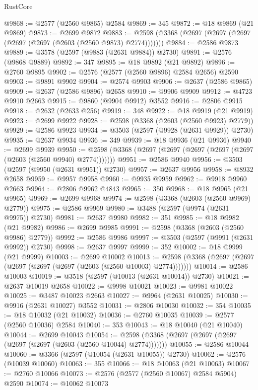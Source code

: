 \begin{lexlean}{RustCore}
\begin{coremodule}
@9868 := @2577 (@2560 @9865) @2584
@9869 := 345
@9872 := @18 @9869 (@21 @9869)
@9873 := @2699 @9872
@9883 := @2598 (@3368 (@2697 (@2697 (@2697 (@2697 (@2697 (@2603 (@2560 @9873) @2774)))))))
@9884 := @2586 @9873
@9889 := @3578 (@2597 (@9883 (@2631 @9884)) @2730)
@9891 := @2576 (@9868 @9889)
@9892 := 347
@9895 := @18 @9892 (@21 @9892)
@9896 := @2760 @9895
@9902 := @2576 (@2577 (@2560 @9896) @2584 @2656) @2590
@9903 := @9891 @9902
@9904 := @2574 @9903
@9906 := @2637 (@2586 @9865)
@9909 := @2637 (@2586 @9896) @2658
@9910 := @9906 @9909
@9912 := @4723 @9910 @2663
@9915 := @9860 (@9904 @9912) @3552
@9916 := @2806 @9915
@9918 := @2632 (@2633 @256)
@9919 := 348
@9922 := @18 @9919 (@21 @9919)
@9923 := @2699 @9922
@9928 := @2598 (@3368 (@2603 (@2560 @9923) @2779))
@9929 := @2586 @9923
@9934 := @3503 (@2597 (@9928 (@2631 @9929)) @2730)
@9935 := @2637 @9934
@9936 := 349
@9939 := @18 @9936 (@21 @9936)
@9940 := @2699 @9939
@9950 := @2598 (@3368 (@2697 (@2697 (@2697 (@2697 (@2697 (@2603 (@2560 @9940) @2774)))))))
@9951 := @2586 @9940
@9956 := @3503 (@2597 (@9950 (@2631 @9951)) @2730)
@9957 := @2637 @9956
@9958 := @8932 @2658
@9959 := @9957 @9958
@9960 := @9935 @9959
@9962 := @9918 @9960 @2663
@9964 := @2806 @9962 @4843
@9965 := 350
@9968 := @18 @9965 (@21 @9965)
@9969 := @2699 @9968
@9974 := @2598 (@3368 (@2603 (@2560 @9969) @2779))
@9975 := @2586 @9969
@9980 := @3488 (@2597 (@9974 (@2631 @9975)) @2730)
@9981 := @2637 @9980
@9982 := 351
@9985 := @18 @9982 (@21 @9982)
@9986 := @2699 @9985
@9991 := @2598 (@3368 (@2603 (@2560 @9986) @2779))
@9992 := @2586 @9986
@9997 := @3503 (@2597 (@9991 (@2631 @9992)) @2730)
@9998 := @2637 @9997
@9999 := 352
@10002 := @18 @9999 (@21 @9999)
@10003 := @2699 @10002
@10013 := @2598 (@3368 (@2697 (@2697 (@2697 (@2697 (@2697 (@2603 (@2560 @10003) @2774)))))))
@10014 := @2586 @10003
@10019 := @3518 (@2597 (@10013 (@2631 @10014)) @2730)
@10021 := @2637 @10019 @2658
@10022 := @9998 @10021
@10023 := @9981 @10022
@10025 := @3487 @10023 @2663
@10027 := @9964 (@2631 @10025)
@10030 := @9916 (@2631 @10027) @3552
@10031 := @2806 @10030
@10032 := 354
@10035 := @18 @10032 (@21 @10032)
@10036 := @2760 @10035
@10039 := @2577 (@2560 @10036) @2584
@10040 := 353
@10043 := @18 @10040 (@21 @10040)
@10044 := @2699 @10043
@10054 := @2598 (@3368 (@2697 (@2697 (@2697 (@2697 (@2697 (@2603 (@2560 @10044) @2774)))))))
@10055 := @2586 @10044
@10060 := @3366 (@2597 (@10054 (@2631 @10055)) @2730)
@10062 := @2576 (@10039 @10060)
@10063 := 355
@10066 := @18 @10063 (@21 @10063)
@10067 := @2760 @10066
@10073 := @2576 (@2577 (@2560 @10067) @2584 @5904) @2590
@10074 := @10062 @10073

\end{coremodule}
\end{lexlean}

